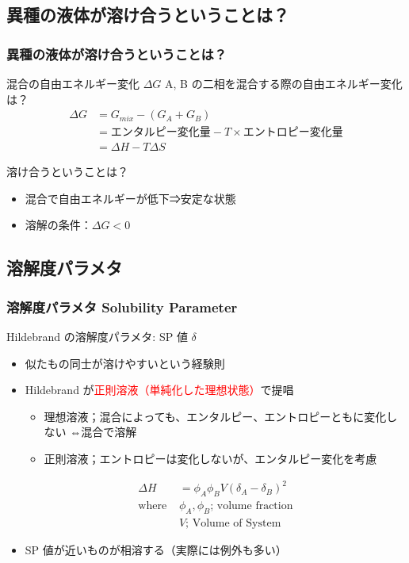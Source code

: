 \documentclass[unicode,12pt]{beamer}%
\begin{document}
\subsection{異種の液体が溶け合うということは？}
\begin{frame}
	\frametitle{異種の液体が溶け合うということは？}
	\begin{exampleblock}{混合の自由エネルギー変化 $\Delta G$}
		A, B の二相を混合する際の自由エネルギー変化は？
		\vspace{-.5\baselineskip}
		\begin{align*}
			\Delta G 
			&= G_{mix} - (G_A + G_B) \\
			&= \text{エンタルピー変化量} - T \times \text{エントロピー変化量} \\
			&= \Delta H -T \Delta S
		\end{align*}
	\end{exampleblock}
	
	\begin{block}{溶け合うということは？}
		\begin{itemize}
			\item 混合で自由エネルギーが低下⇒安定な状態
			\item 溶解の条件：$\Delta G < 0$
		\end{itemize}
	\end{block}
\end{frame}

\subsection{溶解度パラメタ}
\begin{frame}
	\frametitle{溶解度パラメタ Solubility Parameter}
		\begin{block}{Hildebrand の溶解度パラメタ: SP 値 $\delta$}
			\begin{itemize}
				\item 似たもの同士が溶けやすいという経験則
				\item Hildebrand が\textcolor{red}{正則溶液（単純化した理想状態）}で提唱
				\begin{itemize}
					\item 理想溶液；混合によっても、エンタルピー、エントロピーともに変化しない
					⇔混合で溶解
					\item 正則溶液；エントロピーは変化しないが、エンタルピー変化を考慮
				\end{itemize}
				\vspace{-.5\baselineskip}
				\begin{align*}
					\Delta H &= \phi_A \phi_B V (\delta_A -\delta_B)^2 \\
					\text{where }& \phi_A, \phi_B \text{; volume fraction}\\
					& V \text{; Volume of System}
				\end{align*}
				\item SP 値が近いものが相溶する（実際には例外も多い）
			\end{itemize}
		\end{block}
\end{frame}
\end{document}
